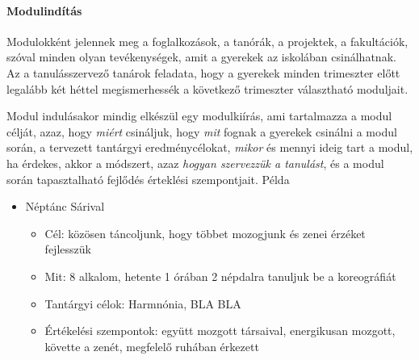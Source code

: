 \paragraph{Modulindítás}\label{modulinduxedtuxe1s}

Modulokként jelennek meg a foglalkozások, a tanórák, a projektek, a
fakultációk, szóval minden olyan tevékenységek, amit a gyerekek az
iskolában csinálhatnak. Az a tanulásszervező tanárok feladata, hogy a
gyerekek minden trimeszter előtt legalább két héttel megismerhessék a
következő trimeszter választható moduljait.

Modul indulásakor mindig elkészül egy modulkiírás, ami tartalmazza a
modul célját, azaz, hogy \emph{miért} csináljuk, hogy \emph{mit} fognak
a gyerekek csinálni a modul során, a tervezett tantárgyi
eredménycélokat, \emph{mikor} és mennyi ideig tart a modul, ha érdekes,
akkor a módszert, azaz \emph{hogyan szervezzük a tanulást}, és a modul
során tapasztalható fejlődés érteklési szempontjait. Példa

\begin{itemize}

  \item
        Néptánc Sárival

        \begin{itemize}
          \item
                Cél: közösen táncoljunk, hogy többet mozogjunk és zenei érzéket
                fejlesszük
          \item
                Mit: 8 alkalom, hetente 1 órában 2 népdalra tanuljuk be a
                koreográfiát
          \item
                Tantárgyi célok: Harmnónia, BLA BLA
          \item
                Értékelési szempontok: együtt mozgott társaival, energikusan
                mozgott, követte a zenét, megfelelő ruhában érkezett
        \end{itemize}
\end{itemize}